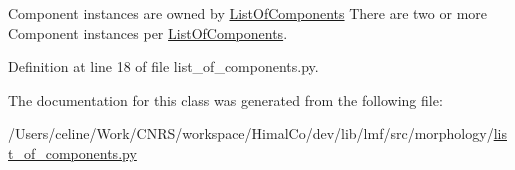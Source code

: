 Component instances are owned by \hyperlink{classlmf_1_1src_1_1morphology_1_1list__of__components_1_1_list_of_components}{List\+Of\+Components} There are two or more Component instances per \hyperlink{classlmf_1_1src_1_1morphology_1_1list__of__components_1_1_list_of_components}{List\+Of\+Components}. 



Definition at line 18 of file list\+\_\+of\+\_\+components.\+py.



The documentation for this class was generated from the following file\+:\begin{DoxyCompactItemize}
\item 
/\+Users/celine/\+Work/\+C\+N\+R\+S/workspace/\+Himal\+Co/dev/lib/lmf/src/morphology/\hyperlink{list__of__components_8py}{list\+\_\+of\+\_\+components.\+py}\end{DoxyCompactItemize}
